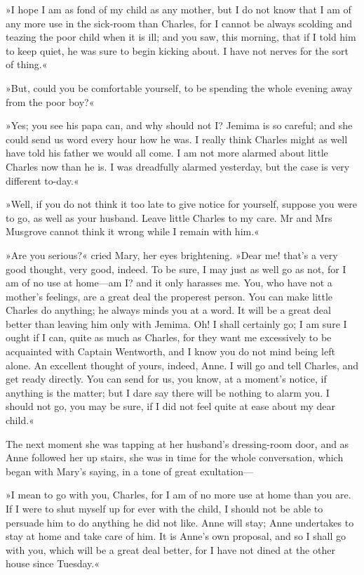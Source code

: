»I hope I am as fond of my child as any mother, but I do not know that I am of any more use in the sick-room than Charles, for I cannot be always scolding and teazing the poor child when it is ill; and you saw, this morning, that if I told him to keep quiet, he was sure to begin kicking about. I have not nerves for the sort of thing.«

»But, could you be comfortable yourself, to be spending the whole evening away from the poor boy?«

»Yes; you see his papa can, and why should not I? Jemima is so careful; and she could send us word every hour how he was. I really think Charles might as well have told his father we would all come. I am not more alarmed about little Charles now than he is. I was dreadfully alarmed yesterday, but the case is very different to-day.«

»Well, if you do not think it too late to give notice for yourself, suppose you were to go, as well as your husband. Leave little Charles to my care. Mr and Mrs Musgrove cannot think it wrong while I remain with him.«

»Are you serious?« cried Mary, her eyes brightening. »Dear me! that's a very good thought, very good, indeed. To be sure, I may just as well go as not, for I am of no use at home—am I? and it only harasses me. You, who have not a mother's feelings, are a great deal the properest person. You can make little Charles do anything; he always minds you at a word. It will be a great deal better than leaving him only with Jemima. Oh! I shall certainly go; I am sure I ought if I can, quite as much as Charles, for they want me excessively to be acquainted with Captain Wentworth, and I know you do not mind being left alone. An excellent thought of yours, indeed, Anne. I will go and tell Charles, and get ready directly. You can send for us, you know, at a moment's notice, if anything is the matter; but I dare say there will be nothing to alarm you. I should not go, you may be sure, if I did not feel quite at ease about my dear child.«

The next moment she was tapping at her husband's dressing-room door, and as Anne followed her up stairs, she was in time for the whole conversation, which began with Mary's saying, in a tone of great exultation—

»I mean to go with you, Charles, for I am of no more use at home than you are. If I were to shut myself up for ever with the child, I should not be able to persuade him to do anything he did not like. Anne will stay; Anne undertakes to stay at home and take care of him. It is Anne's own proposal, and so I shall go with you, which will be a great deal better, for I have not dined at the other house since Tuesday.«

